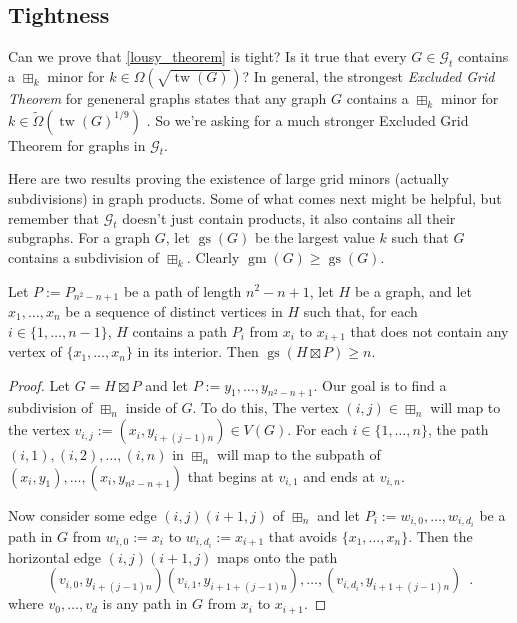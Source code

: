 \documentclass{patmorin}
\DeclareMathOperator{\tw}{tw}
\DeclareMathOperator{\gm}{gm}
\DeclareMathOperator{\gs}{gs}
\begin{document}
\subsection{Tightness}

Can we prove that \cref{lousy_theorem} is tight?  Is it true that every $G\in \mathcal{G}_t$ contains a $\boxplus_k$ minor for $k\in\Omega(\sqrt{\tw(G)})$?  In general, the strongest \emph{Excluded Grid Theorem} for geneneral graphs states that any graph $G$ contains a $\boxplus_{k}$ minor for $k\in\tilde{\Omega}(\tw(G)^{1/9})$ \cite{chuzhoy.tan:towards}.  So we're asking for a much stronger Excluded Grid Theorem for graphs in $\mathcal{G}_t$.

Here are two results proving the existence of large grid minors (actually subdivisions) in graph products.  Some of what comes next might be helpful, but remember that $\mathcal{G}_t$ doesn't just contain products, it also contains all their subgraphs.  For a graph $G$, let $\gs(G)$ be the largest value $k$ such that $G$ contains a subdivision of $\boxplus_k$.  Clearly $\gm(G)\ge\gs(G)$.


\begin{lem}\label{star_times_path}
    Let $P:=P_{n^2-n+1}$ be a path of length $n^2-n+1$, let $H$ be a graph, and let $x_1,\ldots,x_n$ be a sequence of distinct vertices in $H$ such that, for each $i\in\{1,\ldots,n-1\}$, $H$ contains a path $P_{i}$ from $x_i$ to $x_{i+1}$ that does not contain any vertex of $\{x_1,\ldots,x_n\}$ in its interior.  Then $\gs(H\boxtimes P)\ge n$.
\end{lem}

\begin{proof}
    Let $G=H\boxtimes P$ and let $P:=y_1,\ldots,y_{n^2-n+1}$.  Our goal is to find a subdivision of $\boxplus_n$ inside of $G$.  To do this, The vertex $(i,j)\in\boxplus_n$ will map to the vertex $v_{i,j}:=(x_i,y_{i+(j-1)n})\in V(G)$.  For each $i\in\{1,\ldots,n\}$, the path $(i,1),(i,2),\ldots,(i,n)$ in $\boxplus_n$ will map to the subpath of $(x_i,y_1),\ldots,(x_i,y_{n^2-n+1})$ that begins at $v_{i,1}$ and ends at $v_{i,n}$.

    Now consider some edge $(i,j)(i+1,j)$ of $\boxplus_n$ and let $P_i:=w_{i,0},\ldots,w_{i,d_i}$ be a path in $G$ from $w_{i,0}:=x_i$ to $w_{i,d_i}:=x_{i+1}$ that avoids $\{x_1,\ldots,x_n\}$.  Then the horizontal edge $(i,j)(i+1,j)$ maps onto the path
    \[
        (v_{i,0},y_{i+(j-1)n})(v_{i,1},y_{i+1+(j-1)n}),\ldots,(v_{i,d_i},y_{i+1+(j-1)n}) \enspace .
    \]
    where $v_0,\ldots,v_d$ is any path in $G$ from $x_{i}$ to $x_{i+1}$.
\end{proof}
\end{document}
